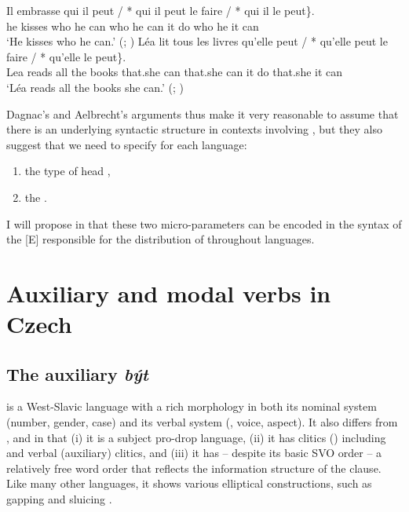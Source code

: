 \documentclass[output=paper,colorlinks,citecolor=brown,]{langsci/langscibook}
\begin{document}
\begin{exe}
\ex \label{10}
\begin{xlist}
\ex \label{10a}
\gll Il embrasse \minsp{\{} qui il peut / *\hspace{-2pt} qui  il  peut  le faire / *\hspace{-2pt} qui  il   le peut\}.\\
he kisses {} who he can  {}  {} who he can it do {}  {} who he it can \\
\glt `He kisses who he can.' \hfill (; \citealt{Dagnac2008})
\ex \label{10b}
\gll  Léa lit tous les livres  \minsp{\{} qu'elle peut / *\hspace{-2pt} qu'elle  peut le faire\hspace{20pt}  / *\hspace{-2pt} qu'elle le peut\}. \\
 Lea reads all the books {} {that.she} can {} {} {that.she} can it do {} {} {that.she} it can {}\\
\glt `Léa reads all the books she can.' \hfill (; \citealt{Dagnac2008})
\end{xlist}
\end{exe}


\noindent Dagnac's and Aelbrecht's arguments thus make it very reasonable to assume that there is an underlying syntactic structure in contexts involving , but they also suggest that we need to specify for each language:
\begin{enumerate}
    \item the type of head ,
    \item the .
\end{enumerate}
I will propose in  that these two micro-parameters can be encoded in the syntax of the  [E] responsible for the distribution of  throughout languages.


\section{Auxiliary and modal verbs in Czech}\label{sec:3}


\subsection{The auxiliary \textit{být}}\label{sec:3.1}

 is a West-Slavic language with a rich morphology in both its nominal system (number, gender, case) and its verbal system (, voice, aspect). It also differs from ,  and  in that (i) it is a subject pro-drop language, (ii) it has  clitics () including  and verbal (auxiliary) clitics, and (iii) it has -- despite its basic SVO order -- a relatively free word order that reflects the information structure of the clause. Like many other languages, it shows various elliptical constructions, such as gapping and sluicing \citep{Gruet-Skrabalova2016}.
\end{document}
